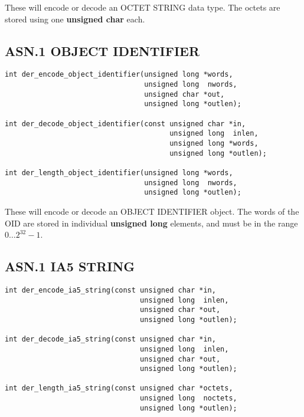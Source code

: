 \documentclass[synpaper]{book}
\begin{document}
These will encode or decode an OCTET STRING data type.  The octets are stored using one \textbf{unsigned char} each.

\subsection{ASN.1 OBJECT IDENTIFIER}

\begin{verbatim}
int der_encode_object_identifier(unsigned long *words,
                                 unsigned long  nwords,
                                 unsigned char *out,
                                 unsigned long *outlen);

int der_decode_object_identifier(const unsigned char *in,
                                       unsigned long  inlen,
                                       unsigned long *words,
                                       unsigned long *outlen);

int der_length_object_identifier(unsigned long *words,
                                 unsigned long  nwords,
                                 unsigned long *outlen);
\end{verbatim}

These will encode or decode an OBJECT IDENTIFIER object.  The words of the OID are stored in individual \textbf{unsigned long} elements, and must be in the range
$0 \ldots 2^{32} - 1$.

\subsection{ASN.1 IA5 STRING}

\begin{verbatim}
int der_encode_ia5_string(const unsigned char *in,
                                unsigned long  inlen,
                                unsigned char *out,
                                unsigned long *outlen);

int der_decode_ia5_string(const unsigned char *in,
                                unsigned long  inlen,
                                unsigned char *out,
                                unsigned long *outlen);

int der_length_ia5_string(const unsigned char *octets,
                                unsigned long  noctets,
                                unsigned long *outlen);
\end{verbatim}
\end{document}

